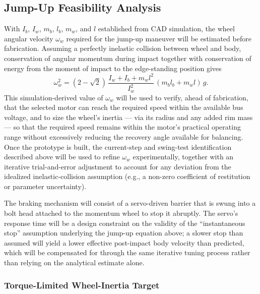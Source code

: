 \subsection{Jump-Up Feasibility Analysis}
\label{sec:jumpup}

With $I_b$, $I_w$, $m_b$, $l_b$, $m_w$, and $l$ established from CAD simulation, the wheel angular velocity $\omega_w$ required for the jump-up maneuver will be estimated before fabrication. Assuming a perfectly inelastic collision between wheel and body, conservation of angular momentum during impact together with conservation of energy from the moment of impact to the edge-standing position gives
\begin{equation}
\omega_w^2 = (2-\sqrt2)\,\frac{I_w+I_b+m_wl^2}{I_w^2}\,(m_bl_b+m_wl)\,g.
\end{equation}
This simulation-derived value of $\omega_w$ will be used to verify, ahead of fabrication, that the selected motor can reach the required speed within the available bus voltage, and to size the wheel's inertia --- via its radius and any added rim mass --- so that the required speed remains within the motor's practical operating range without excessively reducing the recovery angle available for balancing. Once the prototype is built, the current-step and swing-test identification described above will be used to refine $\omega_w$ experimentally, together with an iterative trial-and-error adjustment to account for any deviation from the idealized inelastic-collision assumption (e.g., a non-zero coefficient of restitution or parameter uncertainty).

The braking mechanism will consist of a servo-driven barrier that is swung into a bolt head attached to the momentum wheel to stop it abruptly. The servo's response time will be a design constraint on the validity of the ``instantaneous stop'' assumption underlying the jump-up equation above; a slower stop than assumed will yield a lower effective post-impact body velocity than predicted, which will be compensated for through the same iterative tuning process rather than relying on the analytical estimate alone.
\newpage
\subsubsection{Torque-Limited Wheel-Inertia Target}
\label{sec:jumpup_target}

